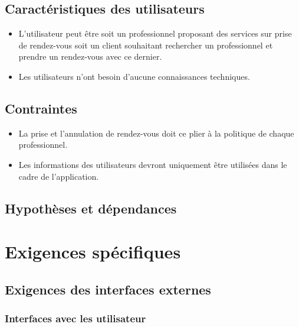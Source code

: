 \documentclass{article}
\begin{document}
\subsection{Caractéristiques des utilisateurs}
\begin{itemize}
\item L'utilisateur peut être soit un professionnel proposant des
  services sur prise de rendez-vous soit
  un client souhaitant rechercher un professionnel et prendre un
  rendez-vous avec ce dernier.
\item Les utilisateurs n'ont besoin d'aucune connaissances techniques.
\end{itemize}
\subsection{Contraintes}
\begin{itemize}
\item La prise et l'annulation de rendez-vous doit ce plier à la
  politique de chaque professionnel.
\item Les informations des utilisateurs devront uniquement être
  utilisées dans le cadre de l'application.
\end{itemize}
\subsection{Hypothèses et dépendances}


\section{Exigences spécifiques}
\subsection{Exigences des interfaces externes}
\subsubsection{Interfaces avec les utilisateur}
\end{document}
